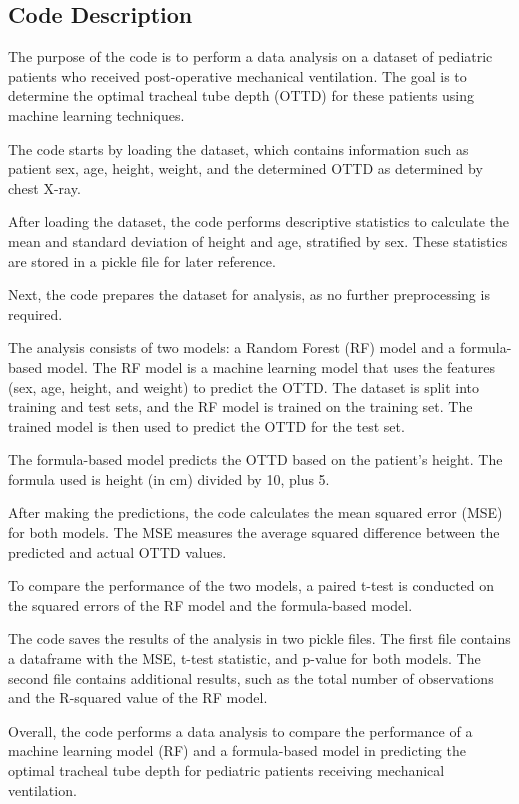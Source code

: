 \documentclass[11pt]{article}
\begin{document}
\subsection{Code Description}

The purpose of the code is to perform a data analysis on a dataset of pediatric patients who received post-operative mechanical ventilation. The goal is to determine the optimal tracheal tube depth (OTTD) for these patients using machine learning techniques.

The code starts by loading the dataset, which contains information such as patient sex, age, height, weight, and the determined OTTD as determined by chest X-ray.

After loading the dataset, the code performs descriptive statistics to calculate the mean and standard deviation of height and age, stratified by sex. These statistics are stored in a pickle file for later reference.

Next, the code prepares the dataset for analysis, as no further preprocessing is required.

The analysis consists of two models: a Random Forest (RF) model and a formula-based model. The RF model is a machine learning model that uses the features (sex, age, height, and weight) to predict the OTTD. The dataset is split into training and test sets, and the RF model is trained on the training set. The trained model is then used to predict the OTTD for the test set.

The formula-based model predicts the OTTD based on the patient's height. The formula used is height (in cm) divided by 10, plus 5.

After making the predictions, the code calculates the mean squared error (MSE) for both models. The MSE measures the average squared difference between the predicted and actual OTTD values.

To compare the performance of the two models, a paired t-test is conducted on the squared errors of the RF model and the formula-based model.

The code saves the results of the analysis in two pickle files. The first file contains a dataframe with the MSE, t-test statistic, and p-value for both models. The second file contains additional results, such as the total number of observations and the R-squared value of the RF model.

Overall, the code performs a data analysis to compare the performance of a machine learning model (RF) and a formula-based model in predicting the optimal tracheal tube depth for pediatric patients receiving mechanical ventilation.
\end{document}

